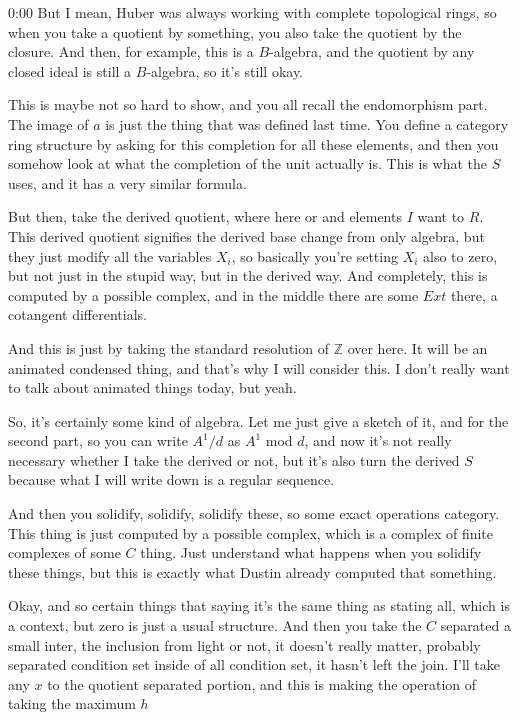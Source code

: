 \begin{unfinished}{0:00}
But I mean, Huber was always working with complete topological rings, so when you take a quotient by something, you also take the quotient by the closure. And then, for example, this is a $B$-algebra, and the quotient by any closed ideal is still a $B$-algebra, so it's still okay.

This is maybe not so hard to show, and you all recall the endomorphism part. The image of $a$ is just the thing that was defined last time. You define a category ring structure by asking for this completion for all these elements, and then you somehow look at what the completion of the unit actually is. This is what the $S$ uses, and it has a very similar formula.

But then, take the derived quotient, where here or and elements $I$ want to $R$. This derived quotient signifies the derived base change from only algebra, but they just modify all the variables $X_i$, so basically you're setting $X_i$ also to zero, but not just in the stupid way, but in the derived way. And completely, this is computed by a possible complex, and in the middle there are some $Ext$ there, a cotangent differentials.

And this is just by taking the standard resolution of $\mathbb{Z}$ over here. It will be an animated condensed thing, and that's why I will consider this. I don't really want to talk about animated things today, but yeah.

So, it's certainly some kind of algebra. Let me just give a sketch of it, and for the second part, so you can write $A^1/d$ as $A^1$ mod $d$, and now it's not really necessary whether I take the derived or not, but it's also turn the derived $S$ because what I will write down is a regular sequence.

And then you solidify, solidify, solidify these, so some exact operations category. This thing is just computed by a possible complex, which is a complex of finite complexes of some $C$ thing. Just understand what happens when you solidify these things, but this is exactly what Dustin already computed that something.

Okay, and so certain things that saying it's the same thing as stating all, which is a context, but zero is just a usual structure. And then you take the $C$ separated a small inter, the inclusion from light or not, it doesn't really matter, probably separated condition set inside of all condition set, it hasn't left the join. I'll take any $x$ to the quotient separated portion, and this is making the operation of taking the maximum $h$


\end{unfinished}
